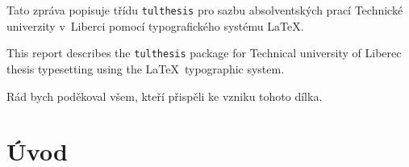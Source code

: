 \documentclass[FP,DP]{tulthesis}
\begin{document}

\begin{abstractCZ}
Tato zpráva popisuje třídu \texttt{tulthesis} pro sazbu absolventských prací
Technické univerzity v~Liberci pomocí typografického systému \LaTeX.
\end{abstractCZ}

\vspace{2cm}

\begin{abstractEN}
This report describes the \texttt{tulthesis} package for Technical university of
Liberec thesis typesetting using the \LaTeX\ typographic system.
\end{abstractEN}

\clearpage

\begin{acknowledgement}
Rád bych poděkoval všem, kteří přispěli ke vzniku tohoto dílka.
\end{acknowledgement}

\tableofcontents

\clearpage

\chapter{Úvod}
\end{document}
